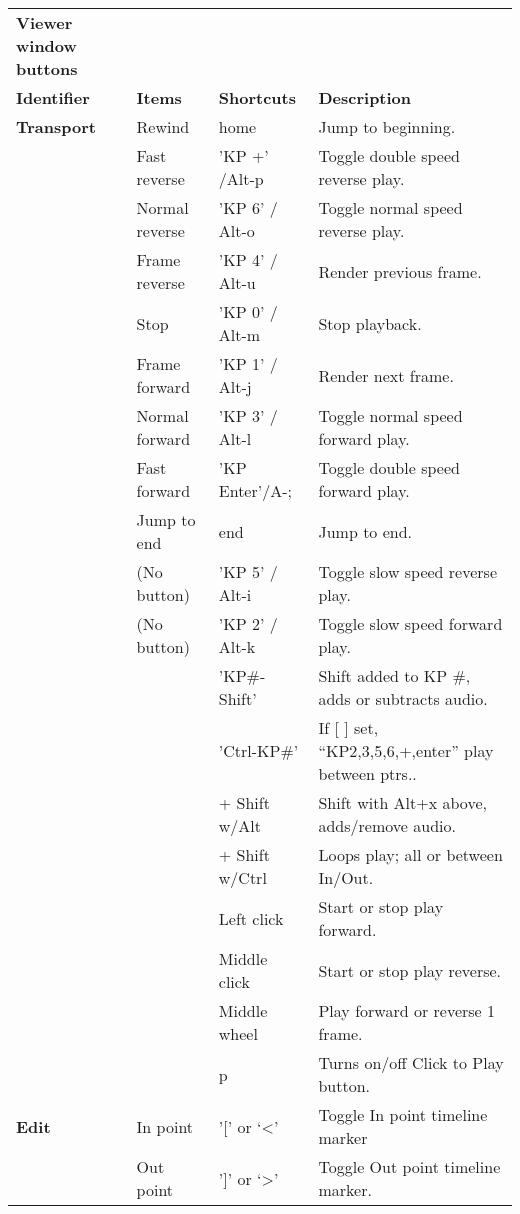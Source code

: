 \begin{longtable}[h]{>{\bfseries}p{}p{}p{}p{}}
  \toprule
  \multicolumn{4}{c}%
  {\textcolor{CinRed}{\textbf{Viewer window buttons}}} \\
  Identifier & \textbf{Items} & \textbf{Shortcuts} & \textbf{Description}\\
  \midrule
  \endhead
  \textcolor{CinBlueText}{Transport} & Rewind & home & Jump to beginning. \\
  & Fast reverse & 'KP +' /Alt-p & Toggle double speed reverse play. \\
  & Normal reverse & 'KP 6' / Alt-o & Toggle normal speed reverse play. \\
  & Frame reverse & 'KP 4' / Alt-u & Render previous frame. \\
  & Stop & 'KP 0' / Alt-m & Stop playback. \\
  & Frame forward & 'KP 1' / Alt-j & Render next frame. \\
  & Normal forward & 'KP 3' / Alt-l & Toggle normal speed forward play. \\
  & Fast forward & 'KP Enter'/A-; & Toggle double speed forward play. \\
  & Jump to end & end & Jump to end. \\
  & (No button) & 'KP 5' / Alt-i & Toggle slow speed reverse play. \\
  & (No button) & 'KP 2' / Alt-k & Toggle slow speed forward play. \\
  &  & 'KP\#-Shift’ & Shift added to KP \#, adds or subtracts audio. \\
  &  & 'Ctrl-KP\#’ & If [ ] set, “KP2,3,5,6,+,enter” play between ptrs.. \\
  &  & + Shift w/Alt & Shift with Alt+x above, adds/remove audio. \\
  &  & + Shift w/Ctrl & Loops play; all or between In/Out. \\
  &  & Left click & Start or stop play forward. \\
  &  & Middle click & Start or stop play reverse. \\
  &  & Middle wheel & Play forward or reverse 1 frame. \\
  &  & p & Turns on/off Click to Play button. \\
  \midrule
  \textcolor{CinBlueText}{Edit} & In point & '[' or ‘<’ & Toggle In point timeline marker\\
  & Out point & ']' or ‘>’ & Toggle Out point timeline marker. \\

\end{longtable}
